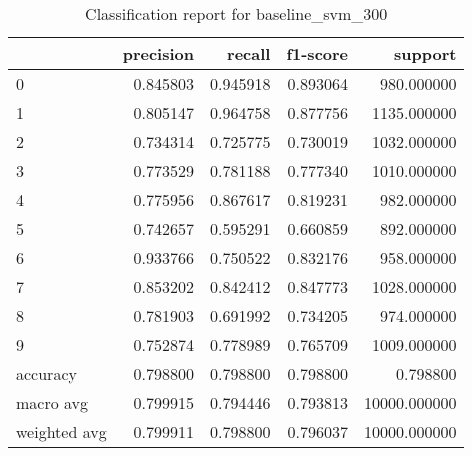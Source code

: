 \begin{table}[htb!]
\centering
\caption{Classification report for baseline_svm_300}
\label{tab:classification-report-baseline_svm_300}
\begin{tabular}{lrrrr}
\toprule
 & precision & recall & f1-score & support \\
\midrule
0 & 0.845803 & 0.945918 & 0.893064 & 980.000000 \\
1 & 0.805147 & 0.964758 & 0.877756 & 1135.000000 \\
2 & 0.734314 & 0.725775 & 0.730019 & 1032.000000 \\
3 & 0.773529 & 0.781188 & 0.777340 & 1010.000000 \\
4 & 0.775956 & 0.867617 & 0.819231 & 982.000000 \\
5 & 0.742657 & 0.595291 & 0.660859 & 892.000000 \\
6 & 0.933766 & 0.750522 & 0.832176 & 958.000000 \\
7 & 0.853202 & 0.842412 & 0.847773 & 1028.000000 \\
8 & 0.781903 & 0.691992 & 0.734205 & 974.000000 \\
9 & 0.752874 & 0.778989 & 0.765709 & 1009.000000 \\
accuracy & 0.798800 & 0.798800 & 0.798800 & 0.798800 \\
macro avg & 0.799915 & 0.794446 & 0.793813 & 10000.000000 \\
weighted avg & 0.799911 & 0.798800 & 0.796037 & 10000.000000 \\
\bottomrule
\end{tabular}
\end{table}
